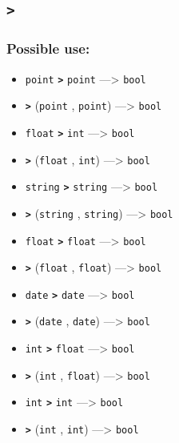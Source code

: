 \documentclass[]{book}
\providecommand{\tightlist}{%
  \setlength{\itemsep}{0pt}\setlength{\parskip}{0pt}}
\theoremstyle{definition}
\theoremstyle{definition}
\theoremstyle{definition}
\theoremstyle{remark}
\begin{document}
\subsection{\texorpdfstring{\texttt{\textgreater{}}}{\textgreater{}}}\label{section-17}

\subsubsection{Possible use:}\label{possible-use-14}

\begin{itemize}
\tightlist
\item
  \texttt{point} \textbf{\texttt{\textgreater{}}} \texttt{point}
  ---\textgreater{} \texttt{bool}
\item
  \textbf{\texttt{\textgreater{}}} (\texttt{point} , \texttt{point})
  ---\textgreater{} \texttt{bool}
\item
  \texttt{float} \textbf{\texttt{\textgreater{}}} \texttt{int}
  ---\textgreater{} \texttt{bool}
\item
  \textbf{\texttt{\textgreater{}}} (\texttt{float} , \texttt{int})
  ---\textgreater{} \texttt{bool}
\item
  \texttt{string} \textbf{\texttt{\textgreater{}}} \texttt{string}
  ---\textgreater{} \texttt{bool}
\item
  \textbf{\texttt{\textgreater{}}} (\texttt{string} , \texttt{string})
  ---\textgreater{} \texttt{bool}
\item
  \texttt{float} \textbf{\texttt{\textgreater{}}} \texttt{float}
  ---\textgreater{} \texttt{bool}
\item
  \textbf{\texttt{\textgreater{}}} (\texttt{float} , \texttt{float})
  ---\textgreater{} \texttt{bool}
\item
  \texttt{date} \textbf{\texttt{\textgreater{}}} \texttt{date}
  ---\textgreater{} \texttt{bool}
\item
  \textbf{\texttt{\textgreater{}}} (\texttt{date} , \texttt{date})
  ---\textgreater{} \texttt{bool}
\item
  \texttt{int} \textbf{\texttt{\textgreater{}}} \texttt{float}
  ---\textgreater{} \texttt{bool}
\item
  \textbf{\texttt{\textgreater{}}} (\texttt{int} , \texttt{float})
  ---\textgreater{} \texttt{bool}
\item
  \texttt{int} \textbf{\texttt{\textgreater{}}} \texttt{int}
  ---\textgreater{} \texttt{bool}
\item
  \textbf{\texttt{\textgreater{}}} (\texttt{int} , \texttt{int})
  ---\textgreater{} \texttt{bool}
\end{itemize}
\end{document}
